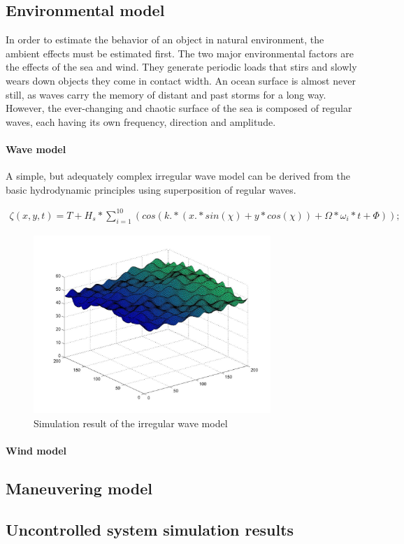 \subsection{Environmental model}

In order to estimate the behavior of an object in natural environment, the ambient effects must be estimated first. The two major environmental factors are the effects of the sea and wind. They generate periodic loads that stirs and slowly wears down objects they come in contact width. An ocean surface is almost never still, as waves carry the memory of distant and past storms for a long way. However, the ever-changing and chaotic surface of the sea is composed of regular waves, each having its own frequency, direction and amplitude.

\paragraph{Wave model} A simple, but adequately complex irregular wave model\cite[p.~14]{shipsim} can be derived from the basic hydrodynamic principles using superposition of regular waves\cite[p.~19]{hydromechanics}.

\begin{align}
		\zeta (x, y, t) = T + H_s * \sum_{i=1}^{10} (cos(k .* (x .* sin(\chi) + y * cos(\chi)) + \Omega * \omega{_i} * t + \Phi));
\end{align}

\begin{figure}[H]
	\centering
	\includegraphics[width=0.8\textwidth]{fig/wavemodel}
	\caption{Simulation result of the irregular wave model}
	\label{fig:wavemodel}
\end{figure}

\paragraph{Wind model}

\subsection{Maneuvering model}

\subsection{Uncontrolled system simulation results}